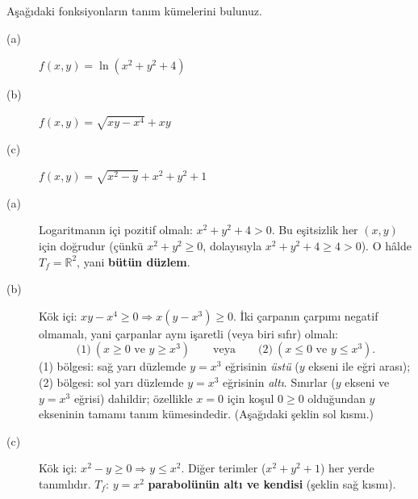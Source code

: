 \begin{soru}
Aşağıdaki fonksiyonların tanım kümelerini bulunuz.
\begin{description}
  \item[(a)] $f(x,y)=\ln(x^2+y^2+4)$
  \item[(b)] $f(x,y)=\sqrt{xy-x^4}+xy$
  \item[(c)] $f(x,y)=\sqrt{x^2-y}+x^2+y^2+1$
\end{description}
\end{soru}
\begin{cevap}
\begin{description}
  \item[(a)] Logaritmanın içi pozitif olmalı: $x^2+y^2+4>0$. Bu eşitsizlik her $(x,y)$ için doğrudur (çünkü
  $x^2+y^2\ge 0$, dolayısıyla $x^2+y^2+4\ge 4>0$). O hâlde $T_f=\mathbb R^2$, yani \textbf{bütün düzlem}.
  \item[(b)] Kök içi: $xy-x^4\ge 0 \Rightarrow x(y-x^3)\ge 0$. İki çarpanın çarpımı negatif olmamalı, yani çarpanlar aynı
  işaretli (veya biri sıfır) olmalı:
  \[
  \text{(1)}\ (x\ge 0 \text{ ve } y\ge x^3) \qquad \text{veya} \qquad \text{(2)}\ (x\le 0\text{ ve } y\le x^3).
  \]
  (1) bölgesi: sağ yarı düzlemde $y=x^3$ eğrisinin \emph{üstü} ($y$ ekseni ile eğri arası);
  (2) bölgesi: sol yarı düzlemde $y=x^3$ eğrisinin \emph{altı}. Sınırlar ($y$ ekseni ve $y=x^3$ eğrisi) dahildir;
  özellikle $x=0$ için koşul $0\ge0$ olduğundan $y$ ekseninin tamamı tanım kümesindedir. (Aşağıdaki şeklin sol kısmı.)
  \item[(c)] Kök içi: $x^2-y\ge 0\Rightarrow y\le x^2$. Diğer terimler ($x^2+y^2+1$) her yerde tanımlıdır.
  $T_f$: $y=x^2$ \textbf{parabolünün altı ve kendisi} (şeklin sağ kısmı).
\end{description}
\end{cevap}

